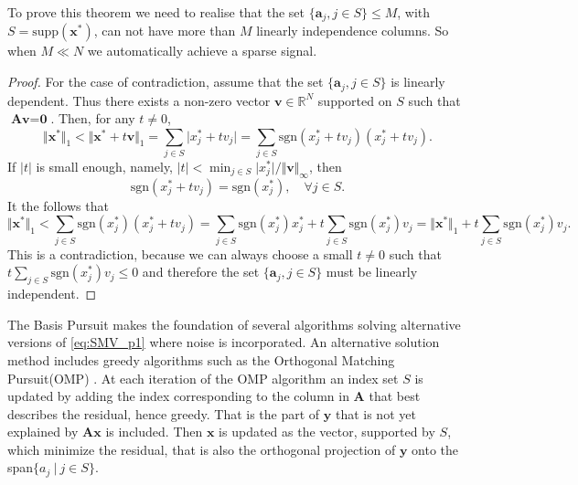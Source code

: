 To prove this theorem we need to realise that the set $\{\textbf{a}_j, j \in S \} \leq M$, with $S = \text{supp}(\textbf{x}^\ast)$, can not have more than $M$ linearly independence columns. So when $M \ll N$ we automatically achieve a sparse signal.
\begin{proof}
For the case of contradiction, assume that the set $\{\textbf{a}_j, j \in S \}$ is linearly dependent. Thus there exists a non-zero vector $\textbf{v} \in \mathbb{R}^N$ supported on $S$ such that $\textbf{Av} = \textbf{0}$. Then, for any $t \neq 0$,
$$
\Vert \textbf{x}^{\ast} \Vert_1 < \Vert \textbf{x}^{\ast} + t \textbf{v} \Vert_1 = \sum_{j \in S} \vert x_j^{\ast} + t v_j \vert = \sum_{j \in S} \text{sgn}(x_j^{\ast} + t v_j )(x_j^{\ast} + t v_j ).
$$
If $|t|$ is small enough, namely, $|t| < \min_{j \in S} \vert x_j^{\ast}\vert / \Vert \textbf{v} \Vert_{\infty}$, then
$$
\text{sgn}(x_j^{\ast} + t v_j) = \text{sgn}(x_j^{\ast}), \quad \forall j \in S.
$$
It the follows that
$$
\Vert \textbf{x}^{\ast} \Vert_1 < \sum_{j \in S} \text{sgn}(x_j^{\ast})(x_j^{\ast} + t v_j ) = \sum_{j \in S} \text{sgn}(x_j^{\ast})x_j^{\ast} + t \sum_{j \in S} \text{sgn}(x_j^{\ast})v_j = \Vert \textbf{x}^{\ast} \Vert_1 + t \sum_{j \in S} \text{sgn}(x_j^{\ast})v_j.
$$
This is a contradiction, because we can always choose a small $t \neq 0$ such that $t \sum_{j \in S} \text{sgn}(x_j^{\ast})v_j \leq 0$ and therefore the set $\{\textbf{a}_j, j \in S \}$ must be linearly independent.
\end{proof}
The Basis Pursuit makes the foundation of several algorithms solving alternative versions of \eqref{eq:SMV_p1} where noise is incorporated. An alternative solution method includes greedy algorithms such as the Orthogonal Matching Pursuit(OMP) \cite[P. 65]{FR}. At each iteration of the OMP algorithm an index set $S$ is updated by adding the index corresponding to the column in $\textbf{A}$ that best describes the residual, hence greedy. That is the part of $\textbf{y}$ that is not yet explained by $\textbf{Ax}$ is included. Then $\textbf{x}$ is updated as the vector, supported by $S$, which minimize the residual, that is also the orthogonal projection  of $\textbf{y}$ onto the span$\{a_j \ \vert \ j \in S \}$. 
